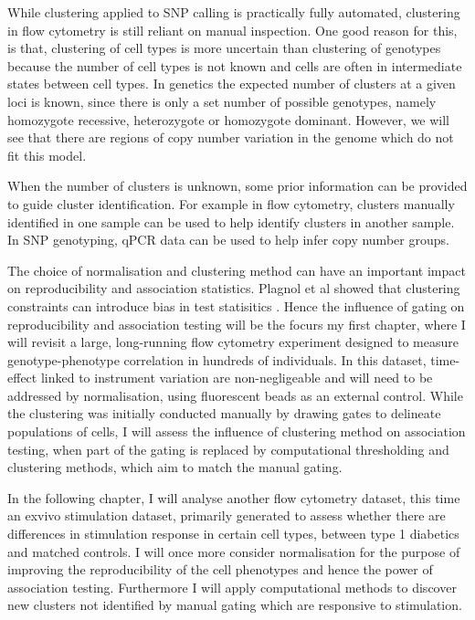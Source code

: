 While clustering applied to \gls{SNP} calling is practically fully automated,
clustering in flow cytometry is still reliant on manual inspection.
One good reason for this, is that,
clustering of cell types is more uncertain than clustering of genotypes because the number of cell types is not known and
cells are often in intermediate states between cell types.
In genetics the expected number of clusters at a given loci is known,
since there is only a set number of possible genotypes, namely homozygote recessive,
heterozygote or homozygote dominant.
However, we will see that there are regions of copy number variation in the genome
which do not fit this model.

When the number of clusters is unknown, some prior information can be provided to guide cluster identification.
For example in flow cytometry, clusters manually identified in one sample can be used to help identify clusters in another sample.
In SNP genotyping, qPCR data can be used to help infer copy number groups.

The choice of normalisation and clustering method can have an important impact on reproducibility and association statistics.
Plagnol et al showed that clustering constraints can introduce bias in test statisitics \citep{Plagnol:2007dw}.
Hence the influence of gating on reproducibility and association testing will be the focurs my first chapter, where I will revisit a large,
long-running flow cytometry experiment designed to measure genotype-phenotype correlation in hundreds of individuals.
In this dataset, time-effect linked to instrument variation are non-negligeable and will need to be addressed by normalisation,
using fluorescent beads as an external control.
While the clustering was initially conducted manually by drawing gates to delineate populations of cells,
I will assess the influence of clustering method on association testing,
when part of the gating is replaced by computational thresholding and clustering methods, which aim
to match the manual gating.  

In the following chapter, I will analyse another flow cytometry dataset, this time an exvivo stimulation dataset,
primarily generated to assess whether there are differences in stimulation response in certain cell types, between type 1 diabetics and matched controls.
I will once more consider normalisation for the purpose of improving the reproducibility of the cell phenotypes and hence the power of association testing.
Furthermore I will apply computational methods to discover new clusters not identified by manual gating which are responsive to stimulation.

